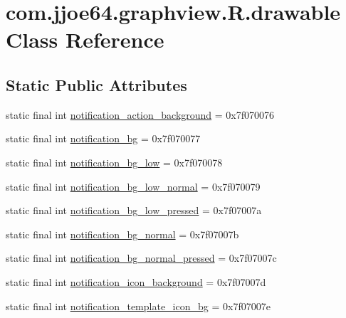 \hypertarget{classcom_1_1jjoe64_1_1graphview_1_1_r_1_1drawable}{}\section{com.\+jjoe64.\+graphview.\+R.\+drawable Class Reference}
\label{classcom_1_1jjoe64_1_1graphview_1_1_r_1_1drawable}
\subsection*{Static Public Attributes}
\begin{DoxyCompactItemize}
\item 
static final int \mbox{\hyperlink{classcom_1_1jjoe64_1_1graphview_1_1_r_1_1drawable_af8199d37c7ea75d09c276d13c219ae7a}{notification\+\_\+action\+\_\+background}} = 0x7f070076
\item 
static final int \mbox{\hyperlink{classcom_1_1jjoe64_1_1graphview_1_1_r_1_1drawable_ada0acc5e3a53f1f6bdde7aa9d59bc451}{notification\+\_\+bg}} = 0x7f070077
\item 
static final int \mbox{\hyperlink{classcom_1_1jjoe64_1_1graphview_1_1_r_1_1drawable_a916fa2f370738eb94008c4a266997e1a}{notification\+\_\+bg\+\_\+low}} = 0x7f070078
\item 
static final int \mbox{\hyperlink{classcom_1_1jjoe64_1_1graphview_1_1_r_1_1drawable_a1504320877e9a7858fada6a8e3130fba}{notification\+\_\+bg\+\_\+low\+\_\+normal}} = 0x7f070079
\item 
static final int \mbox{\hyperlink{classcom_1_1jjoe64_1_1graphview_1_1_r_1_1drawable_afc7366cd118beba2c2baead9c152e41e}{notification\+\_\+bg\+\_\+low\+\_\+pressed}} = 0x7f07007a
\item 
static final int \mbox{\hyperlink{classcom_1_1jjoe64_1_1graphview_1_1_r_1_1drawable_a7b82e573b747d30d6f9344e2f2dc237a}{notification\+\_\+bg\+\_\+normal}} = 0x7f07007b
\item 
static final int \mbox{\hyperlink{classcom_1_1jjoe64_1_1graphview_1_1_r_1_1drawable_a7e9e7ae4eed385d7ac57064ca2d0ce57}{notification\+\_\+bg\+\_\+normal\+\_\+pressed}} = 0x7f07007c
\item 
static final int \mbox{\hyperlink{classcom_1_1jjoe64_1_1graphview_1_1_r_1_1drawable_a42122aa6003d559deaad0c6bd2658b08}{notification\+\_\+icon\+\_\+background}} = 0x7f07007d
\item 
static final int \mbox{\hyperlink{classcom_1_1jjoe64_1_1graphview_1_1_r_1_1drawable_a07b5b1219cb4d79918c32d2de0d7ff61}{notification\+\_\+template\+\_\+icon\+\_\+bg}} = 0x7f07007e

\end{DoxyCompactItemize}
